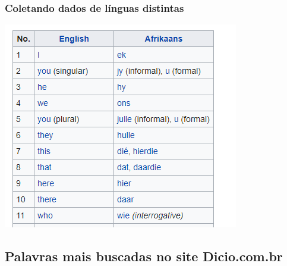 \documentclass{beamer}
\begin{document}
\begin{frame}
\frametitle{Coletando dados de línguas distintas}
\includegraphics[width=\textwidth]{QuadroComparativo.png}
\end{frame}


\subsection{Palavras mais buscadas no site Dicio.com.br} 
\end{document}
